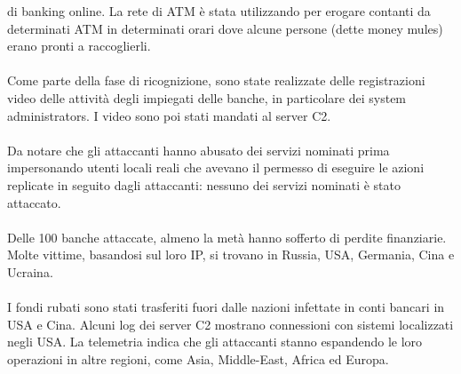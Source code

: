 \documentclass{article}
\begin{document}
di banking online. La rete di ATM è stata utilizzando per erogare contanti da determinati ATM in 
determinati orari dove alcune persone (dette money mules) erano pronti a raccoglierli.\\\\
Come parte della fase di ricognizione, sono state realizzate delle registrazioni video delle attività 
degli impiegati delle banche, in particolare dei system administrators. I video sono poi stati mandati 
al server C2.\\\\
Da notare che gli attaccanti hanno abusato dei servizi nominati prima impersonando utenti locali reali 
che avevano il permesso di eseguire le azioni replicate in seguito dagli attaccanti: nessuno dei 
servizi nominati è stato attaccato.\\\\
Delle 100 banche attaccate, almeno la metà hanno sofferto di perdite finanziarie. Molte vittime, 
basandosi sul loro IP, si trovano in Russia, USA, Germania, Cina e Ucraina.\\\\
I fondi rubati sono stati trasferiti fuori dalle nazioni infettate in conti bancari in USA e Cina. 
Alcuni log dei server C2 mostrano connessioni con sistemi localizzati negli USA. La telemetria 
indica che gli attaccanti stanno espandendo le loro operazioni in altre regioni, come Asia, 
Middle-East, Africa ed Europa. 
\end{document}

